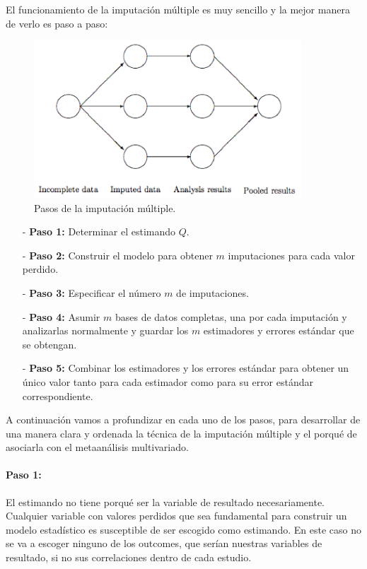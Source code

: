 \documentclass[a4paper,openright,12pt]{report}
\begin{document}
El funcionamiento de la imputación múltiple es muy sencillo y la mejor manera de verlo es paso a paso:
\medskip 
\begin{figure}[htb]
\begin{center}
\includegraphics[width=10cm]{Imputacion_muliple_imag1}
\caption{Pasos de la imputación múltiple.}
\label{Fig_imputacion_multiple}
\end{center}
\end{figure}
\begin{itemize}
\newpage
\item[-] \textbf{Paso 1:} Determinar el estimando $Q$.
\item[-] \textbf{Paso 2:} Construir el modelo para obtener $m$ imputaciones para cada valor perdido.
\item[-] \textbf{Paso 3:} Especificar el número $m$ de imputaciones.
\item[-] \textbf{Paso 4:} Asumir $m$ bases de datos completas, una por cada imputación y analizarlas normalmente y guardar los $m$ estimadores y errores estándar que se obtengan.
\item[-] \textbf{Paso 5:} Combinar los estimadores y los errores estándar para obtener un único valor tanto para cada estimador como para su error estándar correspondiente.
\end{itemize}

A continuación vamos a profundizar en cada uno de los pasos, para desarrollar de una manera clara y ordenada la técnica de la imputación múltiple y el porqué de asociarla con el metaanálisis multivariado.

\paragraph{Paso 1:}
El estimando no tiene porqué ser la variable de resultado necesariamente. Cualquier variable con valores perdidos que sea fundamental para construir un modelo estadístico es susceptible de ser escogido como estimando. En este caso no se va a escoger ninguno de los outcomes, que serían nuestras variables de resultado, si no sus correlaciones dentro de cada estudio.
\end{document}

